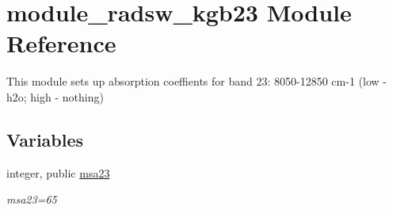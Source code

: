 \hypertarget{namespacemodule__radsw__kgb23}{}\section{module\+\_\+radsw\+\_\+kgb23 Module Reference}
\label{namespacemodule__radsw__kgb23}


This module sets up absorption coeffients for band 23\+: 8050-\/12850 cm-\/1 (low -\/ h2o; high -\/ nothing)  


\subsection*{Variables}
\begin{DoxyCompactItemize}
\item 
\mbox{\label{namespacemodule__radsw__kgb23_a744e7ef73b8d3cc01ff9c6a6010d95d7}} 
integer, public \hyperlink{namespacemodule__radsw__kgb23_a744e7ef73b8d3cc01ff9c6a6010d95d7}{msa23}
\begin{DoxyCompactList}\small\item\em msa23=65 \end{DoxyCompactList}\end{DoxyCompactItemize}
